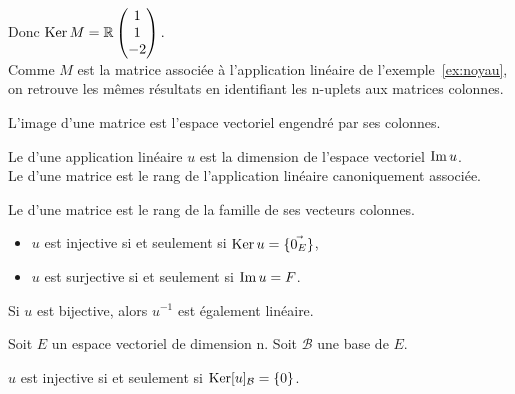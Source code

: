 \documentclass{book}
\begin{document}
\begin{Exemple}
Donc $\operatorname{Ker} M =\mathbb{R} \begin{pmatrix}1 \\1 \\-2\\\end{pmatrix}.$\\
Comme $M$ est la matrice associée à l'application linéaire de l'exemple~\ref{ex:noyau}, on retrouve les mêmes résultats en identifiant les n-uplets aux matrices colonnes. 
\end{Exemple}
\begin{Proposition}
L'image d'une matrice est l'espace vectoriel engendré par ses colonnes.
\end{Proposition}
\begin{Definition}[Rang] Le  d'une  application linéaire $u$ est  la dimension de l'espace vectoriel $\operatorname{Im} u$.\\
Le  d'une matrice est le rang de l'application linéaire canoniquement associée.
\end{Definition}
\begin{Proposition} Le  d'une matrice est le rang de la famille de ses vecteurs colonnes. 
\end{Proposition}
\begin{Proposition}  
\begin{itemize}
\item
  $u$ est injective si et seulement si $\operatorname{Ker} u = \{\vec{0_E}\}$,
\item
  $u$ est surjective si et seulement si $\operatorname{Im} u = F$.
\end{itemize}
\end{Proposition}
\begin{Proposition}
Si $u$ est bijective, alors $u^{-1}$ est également linéaire.
\end{Proposition}
\begin{Proposition}[Dualité]
Soit $E$ un espace vectoriel de dimension n. Soit $\mathcal{B}$ une base de $E$. 
\begin{center}
$u$ est injective si et seulement si $\operatorname{Ker} [u]_\mathcal{B}= \{0\}$.
\end{center}   
\end{Proposition}
\end{document}
